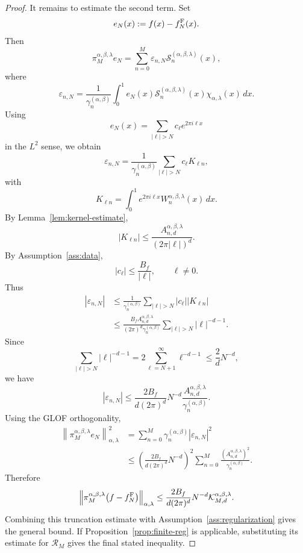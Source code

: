\documentclass[UTF8]{ctexart}
\begin{document}
\begin{proof}
It remains to estimate the second term. Set
\[
    e_N(x):=f(x)-f_N^{\rm F}(x).
\]
Then
\[
    \pi_M^{\alpha,\beta,\lambda}e_N
    =
    \sum_{n=0}^M
    \varepsilon_{n,N}
    \mathcal S_n^{(\alpha,\beta,\lambda)}(x),
\]
where
\[
    \varepsilon_{n,N}
    =
    \frac{1}{\gamma_n^{(\alpha,\beta)}}
    \int_0^1
    e_N(x)
    \mathcal S_n^{(\alpha,\beta,\lambda)}(x)
    \chi_{\alpha,\lambda}(x)\,dx .
\]
Using
\[
    e_N(x)
    =
    \sum_{|\ell|>N}c_\ell e^{2\pi i\ell x}
\]
in the $L^2$ sense, we obtain
\[
    \varepsilon_{n,N}
    =
    \frac{1}{\gamma_n^{(\alpha,\beta)}}
    \sum_{|\ell|>N}
    c_\ell K_{\ell n},
\]
with
\[
    K_{\ell n}
    =
    \int_0^1
    e^{2\pi i\ell x}
    W_n^{\alpha,\beta,\lambda}(x)\,dx .
\]
By Lemma~\ref{lem:kernel-estimate},
\[
    |K_{\ell n}|
    \le
    \frac{
    A_{n,d}^{\alpha,\beta,\lambda}
    }{
    (2\pi|\ell|)^d
    }.
\]
By Assumption~\ref{ass:data},
\[
    |c_\ell|\le \frac{B_f}{|\ell|},
    \qquad \ell\ne 0.
\]
Thus
\[
\begin{aligned}
    |\varepsilon_{n,N}|
    &\le
    \frac{1}{\gamma_n^{(\alpha,\beta)}}
    \sum_{|\ell|>N}
    |c_\ell|
    |K_{\ell n}|
    \\
    &\le
    \frac{
    B_f A_{n,d}^{\alpha,\beta,\lambda}
    }{
    (2\pi)^d
    \gamma_n^{(\alpha,\beta)}
    }
    \sum_{|\ell|>N}
    |\ell|^{-d-1}.
\end{aligned}
\]
Since
\[
    \sum_{|\ell|>N}
    |\ell|^{-d-1}
    =
    2\sum_{\ell=N+1}^\infty \ell^{-d-1}
    \le
    \frac{2}{d}N^{-d},
\]
we have
\[
    |\varepsilon_{n,N}|
    \le
    \frac{
    2B_f
    }{
    d(2\pi)^d
    }
    N^{-d}
    \frac{
    A_{n,d}^{\alpha,\beta,\lambda}
    }{
    \gamma_n^{(\alpha,\beta)}
    }.
\]
Using the GLOF orthogonality,
\[
\begin{aligned}
    \left\|
    \pi_M^{\alpha,\beta,\lambda}e_N
    \right\|_{\alpha,\lambda}^2
    &=
    \sum_{n=0}^M
    \gamma_n^{(\alpha,\beta)}
    |\varepsilon_{n,N}|^2
    \\
    &\le
    \left(
    \frac{
    2B_f
    }{
    d(2\pi)^d
    }
    N^{-d}
    \right)^2
    \sum_{n=0}^M
    \frac{
    \left(A_{n,d}^{\alpha,\beta,\lambda}\right)^2
    }{
    \gamma_n^{(\alpha,\beta)}
    }.
\end{aligned}
\]
Therefore
\[
    \left\|
    \pi_M^{\alpha,\beta,\lambda}
    \bigl(f-f_N^{\rm F}\bigr)
    \right\|_{\alpha,\lambda}
    \le
    \frac{
    2B_f
    }{
    d(2\pi)^d
    }
    N^{-d}
    \mathcal K_{M,d}^{\alpha,\beta,\lambda}.
\]
Combining this truncation estimate with
Assumption~\ref{ass:regularization} gives the general bound.
If Proposition~\ref{prop:finite-reg} is applicable, substituting its estimate for
$\mathcal R_M$ gives the final stated inequality.
\end{proof}
\end{document}
